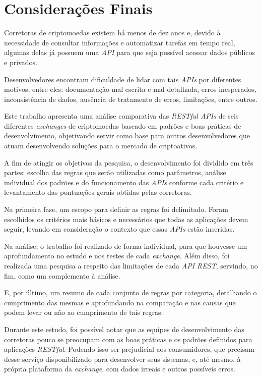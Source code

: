 \chapter{Considerações Finais}
\label{chap:conclusao}
Corretoras de criptomoedas existem há menos de dez anos e, devido à necessidade de consultar informações e automatizar tarefas em tempo real, algumas delas já possuem uma \textit{API} para que seja possível acessar dados públicos e privados.

Desenvolvedores encontram dificuldade de lidar com tais \textit{APIs} por diferentes motivos, entre eles: documentação mal escrita e mal detalhada, erros inesperados, inconsistência de dados, ausência de tratamento de erros, limitações, entre outros.

Este trabalho apresenta uma análise comparativa das \textit{RESTful APIs} de seis diferentes \textit{exchanges} de criptomoedas baseado em padrões e boas práticas de desenvolvimento, objetivando servir como base para outros desenvolvedores que atuam desenvolvendo soluções para o mercado de criptoativos.

A fim de atingir os objetivos da pesquisa, o desenvolvimento foi dividido em três partes: escolha das regras que serão utilizadas como parâmetros, análise individual dos padrões e do funcionamento das \textit{APIs} conforme cada critério e levantamento das pontuações gerais obtidas pelas corretoras.

Na primeira fase, um escopo para definir as regras foi delimitado. Foram escolhidos os critérios mais básicos e necessários que todas as aplicações devem seguir, levando em consideração o contexto que essas \textit{APIs} estão inseridas. 

Na análise, o trabalho foi realizado de forma individual, para que houvesse um aprofundamento no estudo e nos testes de cada
\textit{exchange}. Além disso, foi realizada uma pesquisa a respeito das limitações de cada \textit{API REST},
servindo, no fim, como um complemento à análise.

E, por último, um resumo de cada conjunto de regras por categoria, detalhando o cumprimento das mesmas e aprofundando na comparação e nas causas que podem levar ou não ao cumprimento de tais regras.

Durante este estudo, foi possível notar que as equipes de desenvolvimento das corretoras pouco se preocupam com as boas práticas e os padrões definidos para aplicações \textit{RESTful}. Podendo isso ser prejudicial aos consumidores, que precisam desse serviço disponibilizado para desenvolver seus sistemas, e, até mesmo, à própria plataforma da \textit{exchange}, com dados irreais e outros possíveis erros.

